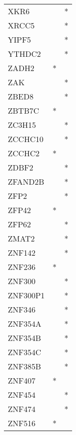 \begin{longtable}{lcc}
XKR6            &                &          * \\
XRCC5           &                &          * \\
YIPF5           &                &          * \\
YTHDC2          &                &          * \\
ZADH2           &              * &            \\
ZAK             &                &          * \\
ZBED8           &                &          * \\
ZBTB7C          &              * &            \\
ZC3H15          &                &          * \\
ZCCHC10         &                &          * \\
ZCCHC2          &              * &            \\
ZDBF2           &                &          * \\
ZFAND2B         &                &          * \\
ZFP2            &                &          * \\
ZFP42           &              * &            \\
ZFP62           &                &          * \\
ZMAT2           &                &          * \\
ZNF142          &                &          * \\
ZNF236          &              * &            \\
ZNF300          &                &          * \\
ZNF300P1        &                &          * \\
ZNF346          &                &          * \\
ZNF354A         &                &          * \\
ZNF354B         &                &          * \\
ZNF354C         &                &          * \\
ZNF385B         &                &          * \\
ZNF407          &              * &            \\
ZNF454          &                &          * \\
ZNF474          &                &          * \\
ZNF516          &              * &            \\

\end{longtable}
